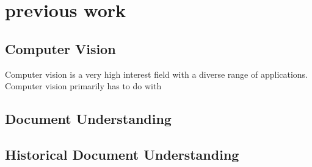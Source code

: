 \chapter{previous work}
\section{Computer Vision}

Computer vision is a very high interest field with a diverse range of applications.  Computer vision primarily has to do with

\section{Document Understanding}



\section{Historical Document Understanding}


